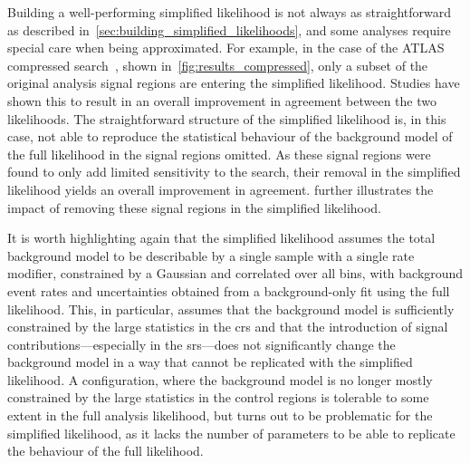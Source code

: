 Building a well-performing simplified likelihood is not always as straightforward as described in~\cref{sec:building_simplified_likelihoods}, and some analyses require special care when being approximated.
For example, in the case of the ATLAS compressed search~\cite{SUSY-2018-16}, shown in~\cref{fig:results_compressed}, only a subset of the original analysis signal regions are entering the simplified likelihood.
Studies have shown this to result in an overall improvement in agreement between the two likelihoods.
The straightforward structure of the simplified likelihood is, in this case, not able to reproduce the statistical behaviour of the background model of the full likelihood in the signal regions omitted.
As these signal regions were found to only add limited sensitivity to the search, their removal in the simplified likelihood yields an overall improvement in agreement.
 further illustrates the impact of removing these signal regions in the simplified likelihood.

It is worth highlighting again that the simplified likelihood assumes the total background model to be describable by a single sample with a single rate modifier, constrained by a Gaussian and correlated over all bins, with background event rates and uncertainties obtained from a background-only fit using the full likelihood.
This, in particular, assumes that the background model is sufficiently constrained by the large statistics in the \glspl{cr} and that the introduction of signal contributions---especially in the \glspl{sr}---does not significantly change the background model in a way that cannot be replicated with the simplified likelihood.
A configuration, where the background model is no longer mostly constrained by the large statistics in the control regions is tolerable to some extent in the full analysis likelihood, but turns out to be problematic for the simplified likelihood, as it lacks the number of parameters to be able to replicate the behaviour of the full likelihood.  

